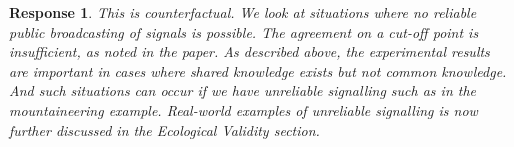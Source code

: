 \documentclass[a4paper]{article}
\newtheorem{response}{Response}
\newenvironment{tobo}{\smallskip \noindent \color{yellow!80!black!80}}{\color{black}\smallskip}
\begin{document}
\begin{response} 
This is counterfactual. We look at situations where no reliable public broadcasting of signals is possible. The agreement on a cut-off point is insufficient, as noted in the paper. As described above, the experimental results are important in cases where shared knowledge exists but not common knowledge. And such situations can occur if we have unreliable signalling such as in the mountaineering example. Real-world examples of unreliable signalling is now further discussed in the Ecological Validity section.






\end{response}
\end{document}
